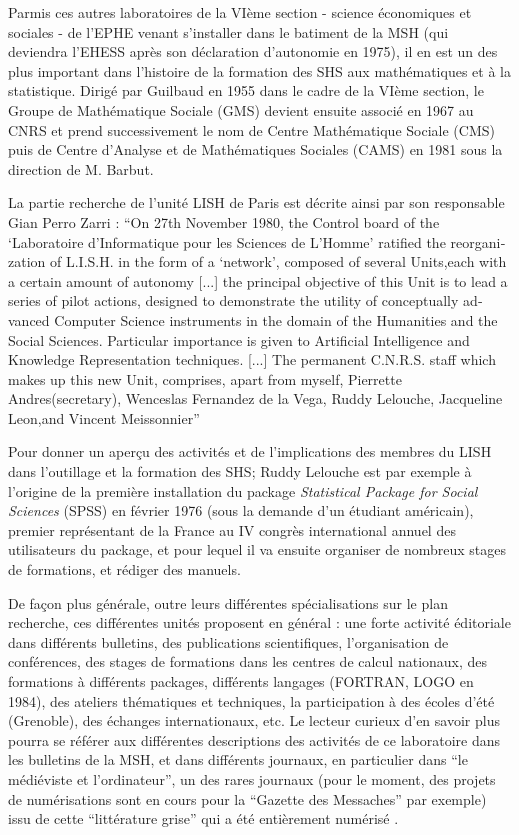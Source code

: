 
Parmis ces autres laboratoires de la VIème section - science économiques et sociales - de l'EPHE venant s'installer dans le batiment de la MSH (qui deviendra l'EHESS après son déclaration d'autonomie en 1975), il en est un des plus important dans l'histoire de la formation des SHS aux mathématiques et à la statistique. Dirigé par Guilbaud en 1955 dans le cadre de la VIème section, le Groupe de Mathématique Sociale (GMS) devient ensuite associé en 1967 au CNRS et prend successivement le nom de Centre Mathématique Sociale (CMS) puis de Centre d’Analyse et de Mathématiques Sociales (CAMS) en 1981 sous la direction de M. Barbut.

La partie recherche de l'unité LISH de Paris est décrite ainsi par son responsable Gian Perro Zarri : \foreignquote{english}{On 27th November 1980, the Control board of the \enquote{Laboratoire d'Informatique pour les Sciences de L'Homme} ratified the reorganization of L.I.S.H. in the form of a \enquote{network}, composed of several Units,each with a certain amount of autonomy [...] the principal objective of this Unit is to lead a series of pilot actions, designed to demonstrate the utility of conceptually advanced Computer Science instruments in the domain of the Humanities and the Social Sciences. Particular importance is given to Artificial Intelligence and Knowledge Representation techniques. [...]  The permanent C.N.R.S. staff which makes up this new Unit, comprises, apart from myself, Pierrette Andres(secretary), Wenceslas Fernandez de la Vega, Ruddy Lelouche, Jacqueline Leon,and Vincent Meissonnier} \autocite{Zarri1981}

Pour donner un aperçu des activités et de l'implications des membres du LISH dans l'outillage et la formation des SHS; Ruddy Lelouche est par exemple à l'origine de la première installation du package \textit{Statistical Package for Social Sciences} (SPSS) en février 1976 (sous la demande d'un étudiant américain), premier représentant de la France au IV congrès international annuel des utilisateurs du package, et pour lequel il va ensuite organiser de nombreux stages de formations, et rédiger des manuels.

De façon plus générale, outre leurs différentes spécialisations sur le plan recherche, ces différentes unités proposent en général : une forte activité éditoriale dans différents bulletins, des publications scientifiques, l'organisation de conférences, des stages de formations dans les centres de calcul nationaux, des formations à différents packages, différents langages (FORTRAN, LOGO en 1984), des ateliers thématiques et techniques, la participation à des écoles d'été (Grenoble), des échanges internationaux, etc. Le lecteur curieux d'en savoir plus pourra se référer aux différentes descriptions des activités de ce laboratoire dans les bulletins de la MSH, et dans différents journaux, en particulier dans \enquote{le médiéviste et l'ordinateur}, un des rares journaux (pour le moment, des projets de numérisations sont en cours pour la \enquote{Gazette des Messaches} par exemple) issu de cette \enquote{littérature grise} qui a été entièrement numérisé .

